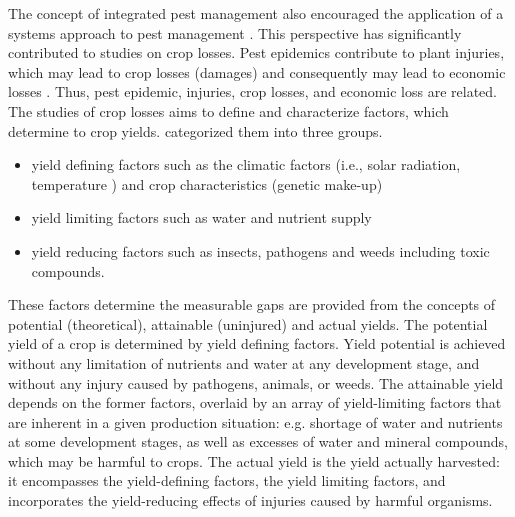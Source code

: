 The concept of integrated pest management also encouraged the application of a systems approach to pest management \citep{teng1992implementing}. This perspective has significantly contributed to studies on crop losses. Pest epidemics contribute to plant injuries, which may lead to crop losses (damages) and consequently may lead to economic losses \citep{Zadok1985}. Thus, pest epidemic, injuries, crop losses, and economic loss are related. 
The studies of crop losses aims to define and characterize factors, which determine to crop yields. \citet{rabbinge1993ecological} categorized them into three groups.

\begin{itemize}
\item yield defining factors such as the climatic factors (i.e., solar radiation, temperature ) and crop characteristics (genetic make-up)
\item yield limiting factors such as water and nutrient supply
\item yield reducing factors such as insects, pathogens and weeds including toxic compounds.
\end{itemize} 
 
These factors determine the measurable gaps are provided from the concepts of potential (theoretical), attainable (uninjured) and actual yields. The potential yield of a crop is determined by yield defining factors. Yield potential is achieved without any limitation of nutrients and water at any development stage, and without any injury caused by pathogens, animals, or weeds. The attainable yield depends on the former factors, overlaid by an array of yield-limiting factors that are inherent in a given production situation: e.g. shortage of water and nutrients at some development stages, as well as excesses of water and mineral compounds, which may be harmful to crops. The actual yield is the yield actually harvested: it encompasses the yield-defining factors, the yield limiting factors, and incorporates the yield-reducing effects of injuries caused by harmful organisms. 

